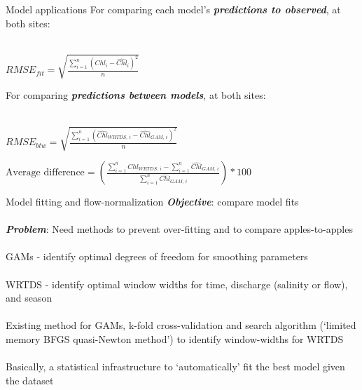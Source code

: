 \documentclass[serif]{beamer}\usepackage[]{graphicx}\usepackage[]{color}
\newcommand{\Bigtxt}[1]{\textbf{\textit{#1}}}
\begin{document}
\begin{frame}{Model applications}
For comparing each model's \Bigtxt{predictions to observed}, at both sites:\\~\\
\begin{center}
$RMSE_{fit} = \sqrt {\frac{{\sum\limits_{{i = 1}}^n {{{\left( {{Chl_i} - {\widehat{Chl}_i}} \right)}^2}} }}{n}}$
\end{center}
For comparing \Bigtxt{predictions between models}, at both sites: \\~\\
\begin{center} 
$RMSE_{btw} = \sqrt {\frac{{\sum\limits_{{i = 1}}^n {{{\left( {{\widehat{Chl}_{WRTDS,\,i}} - {{\widehat{Chl}}_{GAM,\,i}}} \right)}^2}} }}{n}}$
\end{center}
\begin{center}
$\textrm{Average difference} = \left(\frac{\sum\limits_{i = 1}^n \widehat{Chl}_{WRTDS,\,i} - \sum\limits_{i = 1}^n \widehat{Chl}_{GAM,\,i}}{\sum\limits_{i = 1}^n \widehat{Chl}_{GAM,\,i}}\right) * 100$
\end{center}
\end{frame}

\begin{frame}{Model fitting and flow-normalization}
\Bigtxt{Objective}: compare model fits \\~\\
\Bigtxt{Problem}: Need methods to prevent over-fitting and to compare apples-to-apples\\~\\
GAMs - identify optimal degrees of freedom for smoothing parameters \\~\\
WRTDS - identify optimal window widths for time, discharge (salinity or flow), and season \\~\\
Existing method for GAMs, k-fold cross-validation and search algorithm (`limited memory BFGS quasi-Newton method') to identify window-widths for WRTDS \\~\\
Basically, a statistical infrastructure to `automatically' fit the best model given the dataset \\~\\
\end{frame}
\end{document}
